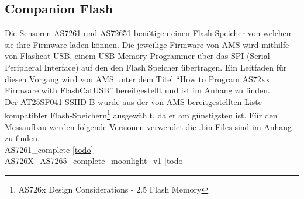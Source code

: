 \subsection{Companion Flash}
\label{sec_Companion_Flash}
Die Sensoren AS7261 und AS72651 benötigen einen Flash-Speicher von welchem sie ihre Firmware laden können.
Die jeweilige Firmware von AMS wird mithilfe von Flashcat-USB, einem USB Memory Programmer über das SPI (Serial Peripheral Interface) auf den den Flash Speicher übertragen.
Ein Leitfaden für diesen Vorgang wird von AMS unter dem Titel ``How to Program AS72xx Firmware with FlashCatUSB'' bereitgestellt und ist im Anhang zu finden.\\
Der AT25SF041-SSHD-B wurde aus der von AMS bereitgestellten Liste kompatibler Flash-Speichern\footnote{AS726x Design Considerations - 2.5 Flash Memory} ausgewählt, da er am günstigsten ist. 
Für den Messaufbau werden folgende Versionen verwendet die .bin Files sind im Anhang zu finden.\\
AS7261\_complete \ref{todo}\\
AS726X\_AS7265\_complete\_moonlight\_v1 \ref{todo}




